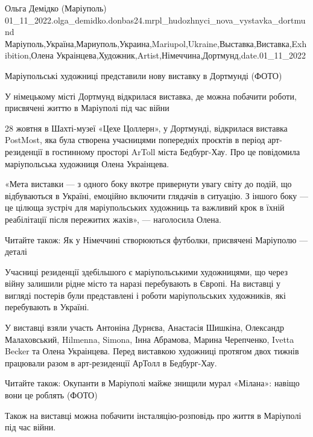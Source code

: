  
 
 
 
 

Ольга Демідко (Маріуполь)
01_11_2022.olga_demidko.donbas24.mrpl_hudozhnyci_nova_vystavka_dortmund
Маріуполь,Україна,Мариуполь,Украина,Mariupol,Ukraine,Выставка,Виставка,Exhibition,Олена Украінцева,Художник,Artist,Німеччина,Дортмунд,date.01_11_2022

Маріупольські художниці представили нову виставку в Дортмунді (ФОТО)

У німецькому місті Дортмунд відкрилася виставка, де можна побачити роботи,
присвячені життю в Маріуполі під час війни

28 жовтня в Шахті-музеї «Цехе Цоллерн», у Дортмунді, відкрилася виставка
PostMost, яка була створена учасницями попередніх проєктів в період
арт-резиденції в гостинному просторі ArToll міста Бедбург-Хау. Про це
повідомила маріупольська художниця Олена Украінцева.

«Мета виставки — з одного боку вкотре привернути увагу світу до подій, що
відбуваються в Україні, емоційно включити глядачів в ситуацію. З іншого боку —
це цілюща зустріч для маріупольських художниць та важливий крок в їхній
реабілітації після пережитих жахів», — наголосила Олена.

Читайте також: Як у Німеччині створюються футболки, присвячені Маріуполю —
деталі

Учасниці резиденції здебільшого є маріупольськими художницями, що через війну
залишили рідне місто та наразі перебувають в Європі. На виставці у вигляді
постерів були представлені і роботи маріупольських художників, які перебувають
в Україні.

У виставці взяли участь Антоніна Дурнєва, Анастасія Шишкіна, Олександр
Малаховський, Hilmenna, Simona, Інна Абрамова, Марина Черепченко, Ivetta Becker
та Олена Украінцева. Перед виставкою художниці протягом двох тижнів працювали
разом в арт-резиденції АрТолл в Бедбург-Хау.

Читайте також: Окупанти в Маріуполі майже знищили мурал «Мілана»: навіщо вони це роблять (ФОТО)

Також на виставці можна побачити інсталяцію-розповідь про життя в Маріуполі під
час війни.

